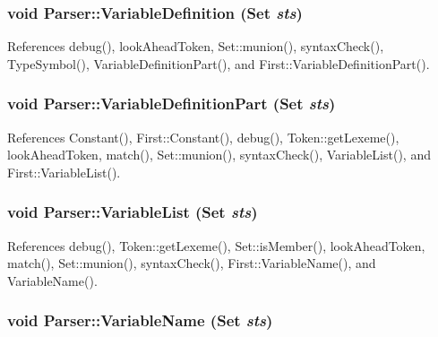 \hypertarget{classParser_a08145dddc145745970fe4849aa667e05}{
\subsubsection[{VariableDefinition}]{\setlength{\rightskip}{0pt plus 5cm}void Parser::VariableDefinition ({\bf Set} {\em sts})}}
\label{classParser_a08145dddc145745970fe4849aa667e05}


References debug(), lookAheadToken, Set::munion(), syntaxCheck(), TypeSymbol(), VariableDefinitionPart(), and First::VariableDefinitionPart().

\hypertarget{classParser_aca0b05f8805667f5057d695ee157ab74}{
\subsubsection[{VariableDefinitionPart}]{\setlength{\rightskip}{0pt plus 5cm}void Parser::VariableDefinitionPart ({\bf Set} {\em sts})}}
\label{classParser_aca0b05f8805667f5057d695ee157ab74}


References Constant(), First::Constant(), debug(), Token::getLexeme(), lookAheadToken, match(), Set::munion(), syntaxCheck(), VariableList(), and First::VariableList().

\hypertarget{classParser_a6bd20fada4e59e17e0f2b00ec5e86ae1}{
\subsubsection[{VariableList}]{\setlength{\rightskip}{0pt plus 5cm}void Parser::VariableList ({\bf Set} {\em sts})}}
\label{classParser_a6bd20fada4e59e17e0f2b00ec5e86ae1}


References debug(), Token::getLexeme(), Set::isMember(), lookAheadToken, match(), Set::munion(), syntaxCheck(), First::VariableName(), and VariableName().

\hypertarget{classParser_a6ab8f6d47347f69f75a4bd8eb75988ac}{
\subsubsection[{VariableName}]{\setlength{\rightskip}{0pt plus 5cm}void Parser::VariableName ({\bf Set} {\em sts})}}
\label{classParser_a6ab8f6d47347f69f75a4bd8eb75988ac}



